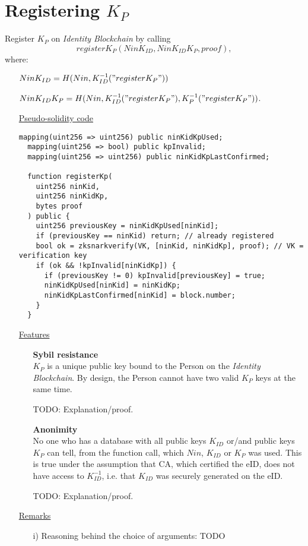 \documentclass{article}
\newcommand{\khk}{K_{P}}
\newcommand{\kid}{K_{ID}}
\newcommand{\pbc}{\textit{Identity Blockchain}}
\begin{document}
\section{Registering $\khk$}
Register $\khk$ on \pbc{} by calling $$register\khk(Nin\kid, Nin\kid\khk, proof),$$
  where:
    \begin{enumerate}
      \item[] $Nin\kid=H(Nin,\kid^{-1}("register\khk"))$
      \item[] $Nin\kid\khk=H(Nin, \kid^{-1}("register\khk"), \khk^{-1}("register\khk"))$.
    \end{enumerate}
\begin{enumerate}[leftmargin=0cm]
\item[] \underline{Pseudo-solidity code}

\hfill\begin{minipage}{\dimexpr\textwidth-20px}
\begin{lstlisting}[language=Solidity]
  mapping(uint256 => uint256) public ninKidKpUsed;
  mapping(uint256 => bool) public kpInvalid;
  mapping(uint256 => uint256) public ninKidKpLastConfirmed;

  function registerKp(
    uint256 ninKid,
    uint256 ninKidKp,
    bytes proof
  ) public {
    uint256 previousKey = ninKidKpUsed[ninKid];
    if (previousKey == ninKid) return; // already registered
    bool ok = zksnarkverify(VK, [ninKid, ninKidKp], proof); // VK = verification key
    if (ok && !kpInvalid[ninKidKp]) {
      if (previousKey != 0) kpInvalid[previousKey] = true;
      ninKidKpUsed[ninKid] = ninKidKp;
      ninKidKpLastConfirmed[ninKid] = block.number;
    }
  }
\end{lstlisting}
\xdef\tpd{\the\prevdepth}
\end{minipage}
\item[] \underline{Features}
\begin{itemize}
      \item[] \textbf{Sybil resistance} \\ $\khk$ is a unique public key bound to the Person on the \pbc{}. By design, the Person cannot have two valid $\khk$ keys at the same time.

      TODO: Explanation/proof.
      \vspace{5px}
    \item[] \textbf{Anonimity} \\ No one who has a database with all public keys $\kid$ or/and public keys $\khk$ can tell, from the function call, which $Nin$, $\kid$ or $\khk$ was used. This is true under the assumption that CA, which certified the eID, does not have access to $\kid^{-1}$, i.e. that $\kid$ was securely generated on the eID.

    TODO: Explanation/proof.
\end{itemize}

\item[] \underline{Remarks}
\begin{itemize}
\item[i)] Reasoning behind the choice of arguments: TODO
\end{itemize}


\end{enumerate}
\end{document}
